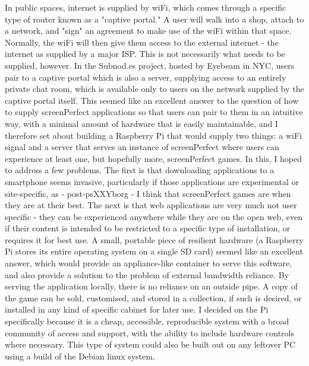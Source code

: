 In public spaces, internet is supplied by wiFi, which comes through a specific type of router known as a "captive portal." A user will walk into a shop, attach to a network, and "sign" an agreement to make use of the wiFi within that space. 
Normally, the wiFi will then give them access to the external internet - the internet as supplied by a major ISP. This is not necessarily what needs to be supplied, however. In the Subnod.es project, hosted by Eyebeam in NYC, users pair to a captive portal which is also a server, supplying access to an entirely private chat room, which is available only to users on the network supplied by the captive portal itself. 
This seemed like an excellent answer to the question of how to supply screenPerfect applications so that users can pair to them in an intuitive way, with a minimal amount of hardware that is easily maintainable, and I therefore set about building a Raspberry Pi that would supply two things: a wiFi signal and a server that serves an instance of screenPerfect where users can experience at least one, but hopefully more, screenPerfect games. 
In this, I hoped to address a few problems. The first is that downloading applications to a smartphone seems invasive, particularly if those applications are experimental or site-specific, as - post-psXXYborg - I think that screenPerfect games are when they are at their best. The next is that web applications are very much not user specific - they can be experienced anywhere while they are on the open web, even if their content is intended to be restricted to a specific type of installation, or requires it for best use. 
A small, portable piece of resilient hardware (a Raspberry Pi stores its entire operating system on a single SD card) seemed like an excellent answer, which would provide an appliance-like container to serve this software, and also provide a solution to the problem of external bandwidth reliance. By serving the application locally, there is no reliance on an outside pipe. A copy of the game can be sold, customised, and stored in a collection, if such is desired, or installed in any kind of specific cabinet for later use. 
I decided on the Pi specifically because it is a cheap, accessible, reproducible system with a broad community of access and support, with the ability to include hardware controls where necessary. This type of system could also be built out on any leftover PC using a build of the Debian linux system.

